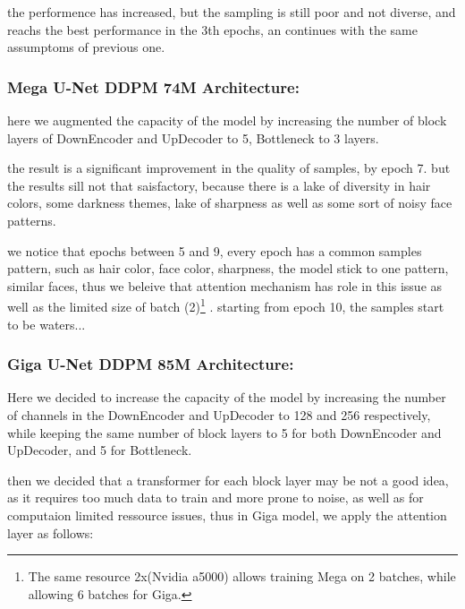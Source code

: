 \documentclass[twocolumn,superscriptaddress,aps]{revtex4-1}
\begin{document}
the performence has increased, but the sampling is still poor and not diverse, and reachs the best performance 
in the 3th epochs, an continues with the same assumptoms of previous one.
\subsubsection{Mega U-Net DDPM 74M Architecture:}
here we augmented the capacity of the model by increasing the number of block layers of DownEncoder and UpDecoder to 5, Bottleneck to 3 layers.

the result is a significant improvement in the quality of samples, by epoch 7. but the results sill not that saisfactory, because there is a lake of diversity in hair colors, some darkness themes, lake of sharpness as well as some sort of noisy face patterns.

we notice that epochs between 5 and 9, every epoch has a common samples pattern, such as hair color, face color, sharpness, the model stick to one pattern, similar faces, thus we beleive that attention mechanism has role in this issue as well as the limited size of batch (2)\footnote{The same resource 2x(Nvidia a5000) allows training Mega on 2 batches, while allowing 6 batches for Giga.} .
starting from epoch 10, the samples start to be waters...%
\subsubsection{Giga U-Net DDPM 85M Architecture:}
Here we decided to increase the capacity of the model by increasing the number of channels in the DownEncoder and UpDecoder to 128 and 256 respectively, while keeping the same number of block layers to 5 for both DownEncoder and UpDecoder, and 5 for Bottleneck.

then we decided that a transformer for each block layer may be not a good idea, as it requires too much data to train and more prone to noise, as well as for computaion limited ressource issues, thus in Giga model, we apply the attention layer as follows:
\end{document}
